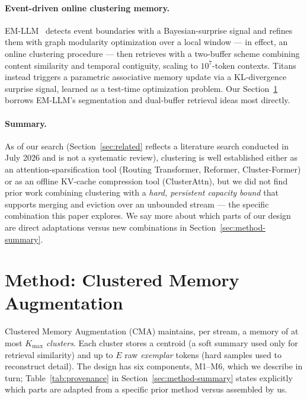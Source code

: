 \documentclass[11pt]{article}
\begin{document}
\paragraph{Event-driven online clustering memory.}
EM-LLM~\citep{emllm2025} detects event boundaries with a Bayesian-surprise signal and refines
them with graph modularity optimization over a local window --- in effect, an online clustering
procedure --- then retrieves with a two-buffer scheme combining content similarity and temporal
contiguity, scaling to $10^{7}$-token contexts. Titans~\citep{titans2025} instead triggers a
parametric associative memory update via a KL-divergence surprise signal, learned as a
test-time optimization problem. Our Section~\ref{sec:method} borrows EM-LLM's segmentation and
dual-buffer retrieval ideas most directly.

\paragraph{Summary.} As of our search (Section~\ref{sec:related} reflects a literature search
conducted in July 2026 and is not a systematic review), clustering is well established either
as an attention-sparsification tool (Routing Transformer, Reformer, Cluster-Former) or as an
offline KV-cache compression tool (ClusterAttn), but we did not find prior work combining
clustering with a \emph{hard, persistent capacity bound} that supports merging and eviction over
an unbounded stream --- the specific combination this paper explores. We say more about which
parts of our design are direct adaptations versus new combinations in
Section~\ref{sec:method-summary}.

\section{Method: Clustered Memory Augmentation}
\label{sec:method}

Clustered Memory Augmentation (CMA) maintains, per stream, a memory of at most $K_{\max}$
\emph{clusters}. Each cluster stores a centroid (a soft summary used only for retrieval
similarity) and up to $E$ raw \emph{exemplar} tokens (hard samples used to reconstruct detail).
The design has six components, M1--M6, which we describe in turn; Table~\ref{tab:provenance}
in Section~\ref{sec:method-summary} states explicitly which parts are adapted from a specific
prior method versus assembled by us.
\end{document}
